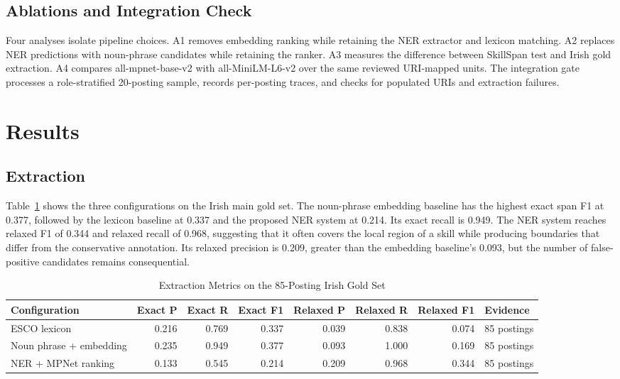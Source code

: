 \documentclass[conference]{IEEEtran}
\begin{document}
\subsection{Ablations and Integration Check}
Four analyses isolate pipeline choices. A1 removes embedding ranking while retaining the NER extractor and lexicon matching. A2 replaces NER predictions with noun-phrase candidates while retaining the ranker. A3 measures the difference between SkillSpan test and Irish gold extraction. A4 compares \textsf{all-mpnet-base-v2} with \textsf{all-MiniLM-L6-v2} over the same reviewed URI-mapped units. The integration gate processes a role-stratified 20-posting sample, records per-posting traces, and checks for populated URIs and extraction failures.

\section{Results}
\subsection{Extraction}
Table~\ref{tab:irish-extraction} shows the three configurations on the Irish main gold set. The noun-phrase embedding baseline has the highest exact span F1 at 0.377, followed by the lexicon baseline at 0.337 and the proposed NER system at 0.214. Its exact recall is 0.949. The NER system reaches relaxed F1 of 0.344 and relaxed recall of 0.968, suggesting that it often covers the local region of a skill while producing boundaries that differ from the conservative annotation. Its relaxed precision is 0.209, greater than the embedding baseline's 0.093, but the number of false-positive candidates remains consequential.

\begin{table}[!t]
\caption{Extraction Metrics on the 85-Posting Irish Gold Set}
\label{tab:irish-extraction}
\centering
\small
\begin{tabular}{lrrrrrrl}
\toprule
Configuration & Exact P & Exact R & Exact F1 & Relaxed P & Relaxed R & Relaxed F1 & Evidence \\
\midrule
ESCO lexicon & 0.216 & 0.769 & 0.337 & 0.039 & 0.838 & 0.074 & 85 postings \\
Noun phrase + embedding & 0.235 & 0.949 & 0.377 & 0.093 & 1.000 & 0.169 & 85 postings \\
NER + MPNet ranking & 0.133 & 0.545 & 0.214 & 0.209 & 0.968 & 0.344 & 85 postings \\
\bottomrule
\end{tabular}
\\[1mm]
\par{}
\end{table}
\end{document}
